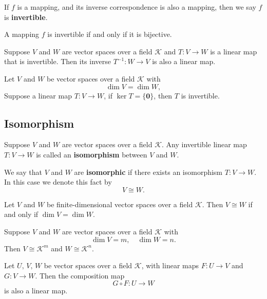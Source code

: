 \documentclass{ctexart}
\begin{document}
	\begin{mydef}
		If $f$ is a mapping, and its inverse correspondence is also a mapping, then we say $f$ is \textbf{invertible}.
	\end{mydef}

	\begin{mypro}
		A mapping $f$ is invertible if and only if it is bijective.
	\end{mypro}

	\begin{mythm}
		Suppose $V$ and $W$ are vector spaces over a field $\mathcal{K}$ and $T: V \to W$ is a linear map that is invertible. Then its inverse $T^{-1}: W \to V$ is also a linear map.
	\end{mythm}

	\begin{mythm}
		Let $V$ and $W$ be vector spaces over a field $\mathcal{K}$ with 
		\[\dim V = \dim W,\]
		Suppose a linear map $T:V \to W$, if $\ker T = \{\mathbf{0}\}$, then $T$ is invertible.
	\end{mythm}
	
	\subsection{Isomorphism}
	\begin{mydef}
		Suppose $V$ and $W$ are vector spaces over a field $\mathcal{K}$. Any invertible linear map $T: V \to W$ is called an \textbf{isomorphism} between $V$ and $W$.
	\end{mydef}
	\begin{mynot}
		We say that $V$ and $W$ are \textbf{isomorphic} if there exists an isomorphism $T : V \to W$. In this case we denote this fact by
		\[
		V \cong W .
		\]
	\end{mynot}
	\begin{mythm}
		Let $V$ and $W$ be finite-dimensional vector spaces over a field $\mathcal{K}$. Then $V \cong W$ if and only if $\dim V = \dim W$.
	\end{mythm}

	\begin{myrmk}
		Suppose $V$ and $W$ are vector spaces over a field $\mathcal{K}$ with
		\[
		\dim V = m, \quad \dim W = n.
		\]
		Then $V \cong \mathcal{K}^m$ and $W \cong \mathcal{K}^n$.
	\end{myrmk}

	\begin{mythm}
		Let $U,\, V,\, W$ be vector spaces over a field $\mathcal{K}$, with linear maps $F: U \to V$ and $G: V \to W$. Then the composition map \[G \circ F: U \to W\] is also a linear map.
	\end{mythm}
\end{document}

